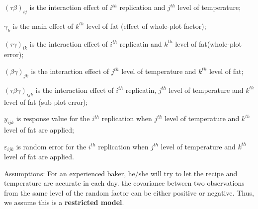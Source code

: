 \documentclass[12pt,]{article}
\begin{document}
\((\tau\beta)_{ij}\) is the interaction effect of \(i^{th}\) replication
and \(j^{th}\) level of temperature;

\(\gamma_{k}\) is the main effect of \(k^{th}\) level of fat (effect of
whole-plot factor);

\((\tau\gamma)_{ik}\) is the interaction effect of \(i^{th}\) replicatin
and \(k^{th}\) level of fat(whole-plot error);

\((\beta\gamma)_{jk}\) is the interaction effect of \(j^{th}\) level of
temperature and \(k^{th}\) level of fat;

\((\tau\beta\gamma)_{ijk}\) is the interaction effect of \(i^{th}\)
replicatin, \(j^{th}\) level of temperature and \(k^{th}\) level of fat
(sub-plot error);

\(y_{ijk}\) is response value for the \(i^{th}\) replication when
\(j^{th}\) level of temperature and \(k^{th}\) level of fat are applied;

\(\varepsilon_{ijk}\) is random error for the \(i^{th}\) replication
when \(j^{th}\) level of temperature and \(k^{th}\) level of fat are
applied.

Assumptions: For an experienced baker, he/she will try to let the recipe
and temperature are accurate in each day. the covariance between two
observations from the same level of the random factor can be either
positive or negative. Thus, we assume this is a \textbf{restricted
model}.
\end{document}
